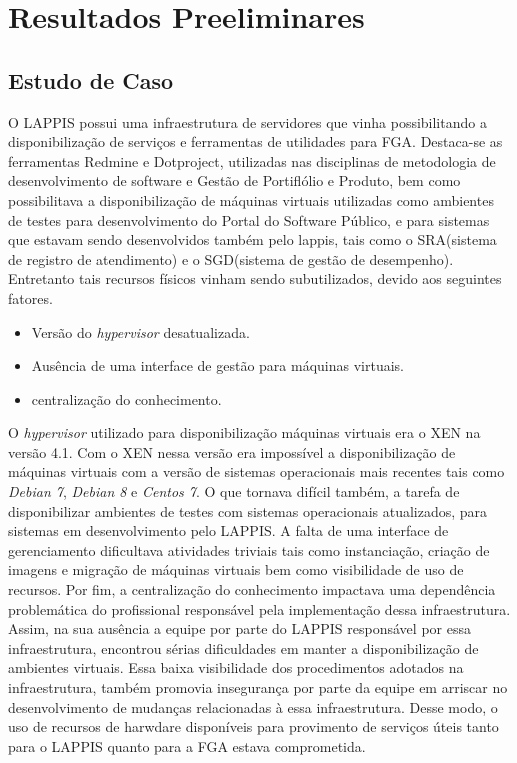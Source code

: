 \chapter{Resultados Preeliminares}
\label{cap:resultados}
\section{Estudo de Caso}
O LAPPIS possui uma infraestrutura de servidores que vinha possibilitando a disponibilização de serviços e ferramentas de utilidades para FGA. Destaca-se as ferramentas Redmine e Dotproject, utilizadas nas disciplinas de metodologia de desenvolvimento de software e Gestão de Portiflólio e Produto, bem como possibilitava a disponibilização de máquinas virtuais utilizadas como ambientes de testes para desenvolvimento do Portal do Software Público, e para sistemas que estavam sendo desenvolvidos também pelo  lappis, tais como o SRA(sistema de registro de atendimento) e o SGD(sistema de gestão de desempenho). Entretanto tais recursos físicos vinham sendo subutilizados, devido aos seguintes fatores.
\begin{itemize}
 \item Versão do \textit{hypervisor} desatualizada.
 \item Ausência de uma interface de gestão para máquinas virtuais.
 \item centralização do conhecimento.
\end{itemize}
      
      O \textit{hypervisor} utilizado para disponibilização máquinas virtuais era o XEN na versão 4.1. Com o XEN nessa versão era impossível a disponibilização de máquinas virtuais com a versão de sistemas operacionais mais recentes tais como \textit{Debian 7}, \textit{Debian 8} e \textit{Centos 7}. O que tornava difícil também, a tarefa de disponibilizar ambientes de testes com sistemas operacionais atualizados, para sistemas em desenvolvimento pelo LAPPIS. A falta de uma interface de gerenciamento dificultava atividades triviais tais como instanciação, criação de imagens e migração de máquinas virtuais bem como visibilidade de uso de recursos. Por fim, a centralização do conhecimento impactava uma dependência problemática do profissional responsável pela implementação dessa infraestrutura. Assim, na sua ausência a equipe por parte do LAPPIS responsável por essa infraestrutura, encontrou sérias dificuldades em manter a disponibilização de ambientes virtuais. Essa baixa visibilidade dos procedimentos adotados na infraestrutura, também promovia insegurança por parte da equipe em arriscar no desenvolvimento de mudanças relacionadas à essa infraestrutura. Desse modo, o uso de recursos de harwdare disponíveis para provimento de serviços úteis tanto para o LAPPIS quanto para a FGA estava comprometida. 
      
